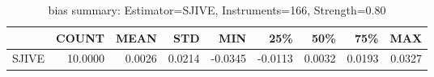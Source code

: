 \begin{table}[ht]
\centering
\caption{bias summary: Estimator=SJIVE, Instruments=166, Strength=0.80}
\begin{tabular}{lrrrrrrrr}
\toprule
 & COUNT & MEAN & STD & MIN & 25\% & 50\% & 75\% & MAX \\
\midrule
SJIVE & 10.0000 & 0.0026 & 0.0214 & -0.0345 & -0.0113 & 0.0032 & 0.0193 & 0.0327 \\
\bottomrule
\end{tabular}
\end{table}
